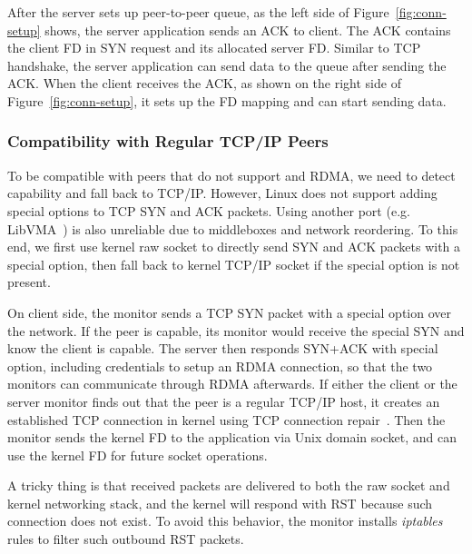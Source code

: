 After the server sets up peer-to-peer queue, as the left side of Figure~\ref{fig:conn-setup} shows, the server application sends an ACK to client. The ACK contains the client FD in SYN request and its allocated server FD.
Similar to TCP handshake, the server application can send data to the queue after sending the ACK.
When the client receives the ACK, as shown on the right side of Figure~\ref{fig:conn-setup}, it sets up the FD mapping and can start sending data.


\subsubsection{Compatibility with Regular TCP/IP Peers}
\quad

To be compatible with peers that do not support \sys{} and RDMA, we need to detect \sys{} capability and fall back to TCP/IP.
However, Linux does not support adding special options to TCP SYN and ACK packets.
Using another port (e.g. LibVMA~\cite{libvma}) is also unreliable due to middleboxes and network reordering.
To this end, we first use kernel raw socket to directly send SYN and ACK packets with a special option, then fall back to kernel TCP/IP socket if the special option is not present.

On client side, the monitor sends a TCP SYN packet with a special option over the network.
If the peer is \sys{} capable, its monitor would receive the special SYN and know the client is \sys{} capable.
The server then responds SYN+ACK with special option, including credentials to setup an RDMA connection, so that the two monitors can communicate through RDMA afterwards.
If either the client or the server monitor finds out that the peer is a regular TCP/IP host, it creates an established TCP connection in kernel using TCP connection repair~\cite{tcp-connection-repair}.
Then the monitor sends the kernel FD to the application via Unix domain socket, and \libipc{} can use the kernel FD for future socket operations.


A tricky thing is that received packets are delivered to both the raw socket and kernel networking stack, and the kernel will respond with RST because such connection does not exist.
To avoid this behavior, the monitor installs \emph{iptables} rules to filter such outbound RST packets.




